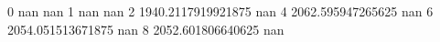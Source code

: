 0 nan nan
1 nan nan
2 1940.2117919921875 nan
4 2062.595947265625 nan
6 2054.051513671875 nan
8 2052.601806640625 nan
